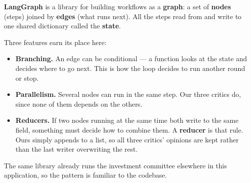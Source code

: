 \documentclass[11pt]{article}
\begin{document}
\begin{specbox}
\textbf{LangGraph} is a library for building workflows as a \textbf{graph}: a set of
\textbf{nodes} (steps) joined by \textbf{edges} (what runs next). All the steps read
from and write to one shared dictionary called the \textbf{state}.

Three features earn its place here:
\begin{itemize}
  \item \textbf{Branching.} An edge can be conditional --- a function looks at the state
        and decides where to go next. This is how the loop decides to run another round
        or stop.
  \item \textbf{Parallelism.} Several nodes can run in the same step. Our three critics
        do, since none of them depends on the others.
  \item \textbf{Reducers.} If two nodes running at the same time both write to the same
        field, something must decide how to combine them. A \textbf{reducer} is that
        rule. Ours simply appends to a list, so all three critics' opinions are kept
        rather than the last writer overwriting the rest.
\end{itemize}
\end{specbox}

The same library already runs the investment committee elsewhere in this application,
so the pattern is familiar to the codebase.
\end{document}
